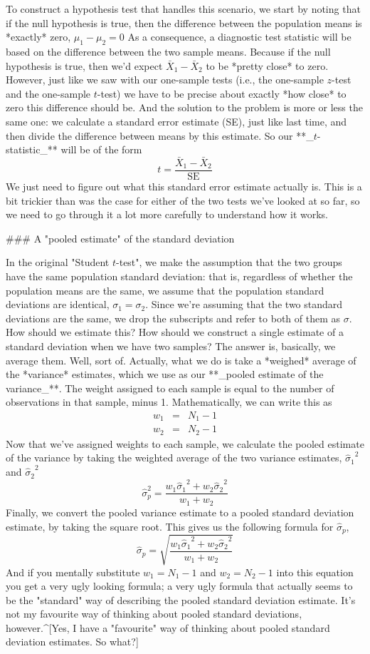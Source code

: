 To construct a hypothesis test that handles this scenario, we start by noting that if the null hypothesis is true, then the difference between the population means is *exactly* zero, 
$\mu_1 - \mu_2 = 0$
As a consequence, a diagnostic test statistic will be based on the difference between the two sample means. Because if the null hypothesis is true, then we'd expect 
$
\bar{X}_1 - \bar{X}_2
$
to be *pretty close* to zero. However, just like we saw with our one-sample tests (i.e., the one-sample $z$-test and the one-sample $t$-test) we have to be precise about exactly *how close* to zero this difference should be. And the solution to the problem is more or less the same one: we calculate a standard error estimate (SE), just like last time, and then divide the difference between means by this estimate. So our **_$t$-statistic_** will be of the form
$$
t = \frac{\bar{X}_1 - \bar{X}_2}{\mbox{SE}}
$$
We just need to figure out what this standard error estimate actually is. This is a bit trickier than was the case for either of the two tests we've looked at so far, so we need to go through it a lot more carefully to understand how it works.

### A "pooled estimate" of the standard deviation

In the original "Student $t$-test", we make the assumption that the two groups have the same population standard deviation: that is, regardless of whether the population means are the same, we assume that the population standard deviations are identical, $\sigma_1 = \sigma_2$. Since we're assuming that the two standard deviations are the same, we drop the subscripts and refer to both of them as $\sigma$. How should we estimate this? How should we construct a single estimate of a standard deviation when we have two samples? The answer is, basically, we average them. Well, sort of. Actually, what we do is take a *weighed* average of the *variance* estimates, which we use as our **_pooled estimate of the variance_**. The weight assigned to each sample is equal to the number of observations in that sample, minus 1. Mathematically, we can write this as
$$
\begin{array}{rcl}
w_1 &=& N_1 - 1\\
w_2 &=& N_2 - 1
\end{array}
$$
Now that we've assigned weights to each sample, we calculate the pooled estimate of the variance by taking the weighted average of the two variance estimates, ${\hat\sigma_1}^2$ and ${\hat\sigma_2}^2$ 
$$
\hat\sigma^2_p = \frac{w_1 {\hat\sigma_1}^2 + w_2 {\hat\sigma_2}^2}{w_1 + w_2}
$$
Finally, we convert the pooled variance estimate to a pooled standard deviation estimate, by taking the square root. This gives us the following formula for $\hat\sigma_p$,
$$
\hat\sigma_p = \sqrt{\frac{w_1 {\hat\sigma_1}^2 + w_2 {\hat\sigma_2}^2}{w_1 + w_2}}
$$
And if you mentally substitute $w_1 = N_1 -1$ and $w_2 = N_2 -1$ into this equation you get a very ugly looking formula; a very ugly formula that actually seems to be the "standard" way of describing the pooled standard deviation estimate. It's not my favourite way of thinking about pooled standard deviations, however.^[Yes, I  have a "favourite" way of thinking about pooled standard deviation estimates. So what?] 

